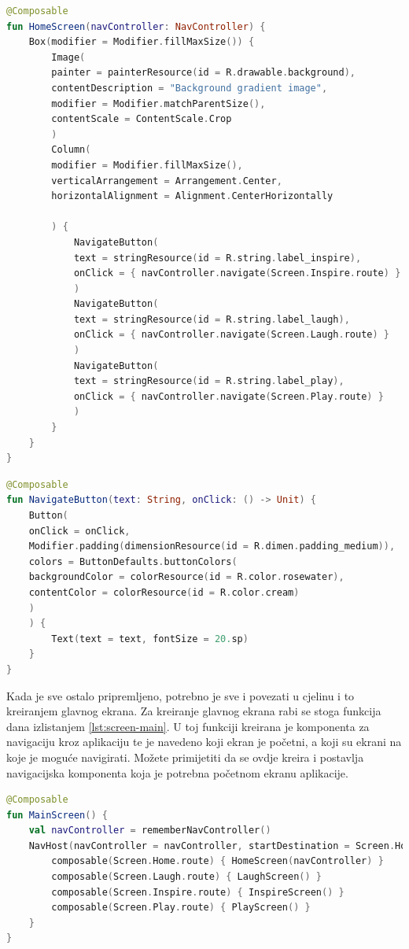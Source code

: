 \documentclass[11pt,a4paper,twoside]{article}
\begin{document}
\begin{lstlisting}[caption={Početni ekran - HomeScreen.kt}, label={lst:screen-home}, language=Kotlin]
@Composable
fun HomeScreen(navController: NavController) {
	Box(modifier = Modifier.fillMaxSize()) {
		Image(
		painter = painterResource(id = R.drawable.background),
		contentDescription = "Background gradient image",
		modifier = Modifier.matchParentSize(),
		contentScale = ContentScale.Crop
		)
		Column(
		modifier = Modifier.fillMaxSize(),
		verticalArrangement = Arrangement.Center,
		horizontalAlignment = Alignment.CenterHorizontally
		
		) {
			NavigateButton(
			text = stringResource(id = R.string.label_inspire),
			onClick = { navController.navigate(Screen.Inspire.route) }
			)
			NavigateButton(
			text = stringResource(id = R.string.label_laugh),
			onClick = { navController.navigate(Screen.Laugh.route) }
			)
			NavigateButton(
			text = stringResource(id = R.string.label_play),
			onClick = { navController.navigate(Screen.Play.route) }
			)
		}
	}
}
\end{lstlisting}

\begin{lstlisting}[caption={Gumb za navigaciju - NavigateButton.kt}, label={lst:navigate-button}, language=Kotlin]
@Composable
fun NavigateButton(text: String, onClick: () -> Unit) {
	Button(
	onClick = onClick,
	Modifier.padding(dimensionResource(id = R.dimen.padding_medium)),
	colors = ButtonDefaults.buttonColors(
	backgroundColor = colorResource(id = R.color.rosewater),
	contentColor = colorResource(id = R.color.cream)
	)
	) {
		Text(text = text, fontSize = 20.sp)
	}
}
\end{lstlisting}

Kada je sve ostalo pripremljeno, potrebno je sve i povezati u cjelinu i to kreiranjem glavnog ekrana. Za kreiranje glavnog ekrana rabi se stoga funkcija dana izlistanjem \ref{lst:screen-main}. U toj funkciji kreirana je komponenta za navigaciju kroz aplikaciju te je navedeno koji ekran je početni, a koji su ekrani na koje je moguće navigirati. Možete primijetiti da se ovdje kreira i postavlja navigacijska komponenta koja je potrebna početnom ekranu aplikacije.

\begin{lstlisting}[caption={Glavni ekran - MainScreen.kt}, label={lst:screen-main}, language=Kotlin]
@Composable
fun MainScreen() {
	val navController = rememberNavController()
	NavHost(navController = navController, startDestination = Screen.Home.route) {
		composable(Screen.Home.route) { HomeScreen(navController) }
		composable(Screen.Laugh.route) { LaughScreen() }
		composable(Screen.Inspire.route) { InspireScreen() }
		composable(Screen.Play.route) { PlayScreen() }
	}
}
\end{lstlisting}
\end{document}
